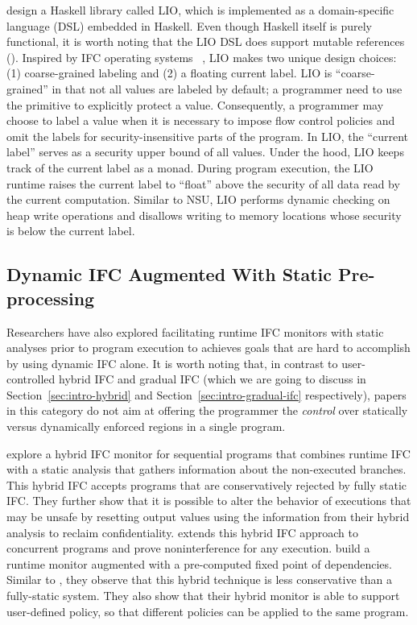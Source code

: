 \textcite{stefan2011flexible,stefan2012flexible,STEFAN:2017ta} design a Haskell
library called LIO, which is implemented as a domain-specific language (DSL)
embedded in Haskell. Even though Haskell itself is purely functional, it is
worth noting that the LIO DSL does support mutable references ().
Inspired by IFC operating systems
~\parencite{efstathopoulos2005labels,zeldovich2011making,krohn2007information,vandebogart2007labels},
LIO makes two unique design choices: (1) coarse-grained labeling and (2) a
floating current label. LIO is ``coarse-grained'' in that not all values are
labeled by default; a programmer need to use the  primitive to
explicitly protect a value. Consequently, a programmer may choose to label a
value when it is necessary to impose flow control policies and omit the labels
for security-insensitive parts of the program. In LIO, the ``current label''
serves as a security upper bound of all values. Under the hood, LIO keeps track
of the current label as a monad. During program execution, the LIO runtime
raises the current label to ``float'' above the security of all data read by the
current computation. Similar to NSU, LIO performs dynamic checking on heap write
operations and disallows writing to memory locations whose security is below the
current label.

\subsection{Dynamic IFC Augmented With Static Pre-processing}
\label{sec:intro-dyn-static}

Researchers have also explored facilitating runtime IFC monitors with static
analyses prior to program execution to achieves goals that are hard to
accomplish by using dynamic IFC alone. It is worth noting that, in contrast to
user-controlled hybrid IFC and gradual IFC (which we are going to discuss in
Section~\ref{sec:intro-hybrid} and Section~\ref{sec:intro-gradual-ifc}
respectively), papers in this category do not aim at offering the programmer the
\emph{control} over statically versus dynamically enforced regions in a single
program.

\textcite{le2005monitoring} explore a hybrid IFC monitor for sequential programs
that combines runtime IFC with a static analysis that gathers information about
the non-executed branches. This hybrid IFC accepts programs that are
conservatively rejected by fully static IFC. They further show that it is
possible to alter the behavior of executions that may be unsafe by resetting
output values using the information from their hybrid analysis to reclaim
confidentiality. \textcite{le2007automaton} extends this hybrid IFC approach to
concurrent programs and prove noninterference for any execution.
\textcite{Shroff:2007tg} build a runtime monitor augmented with a pre-computed
fixed point of dependencies. Similar to \textcite{le2005monitoring}, they
observe that this hybrid technique is less conservative than a fully-static
system. They also show that their hybrid monitor is able to support user-defined
policy, so that different policies can be applied to the same program.

